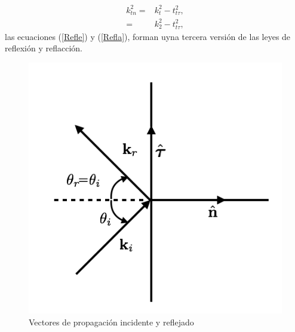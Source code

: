 \documentclass[11pt,fleqn]{book} %
\begin{document}
\begin{equation}
\begin{split} \label{Refla}
k_{tn}^2=&k_t^{2}-t_{t\tau}^2,\\
=&k_{2}^2-t_{t\tau}^2,
\end{split}
\end{equation}
las ecuaciones (\ref{Refle}) y (\ref{Refla}), forman uyna tercera versi\'on de las leyes de reflexi\'on y reflacci\'on.

\begin{figure}[hbtp]
\centering
\includegraphics[scale=0.4]{Pictures/Angulo_i_r.png}
\caption{Vectores de propagaci\'on incidente y reflejado}
\end{figure}
\end{document}
